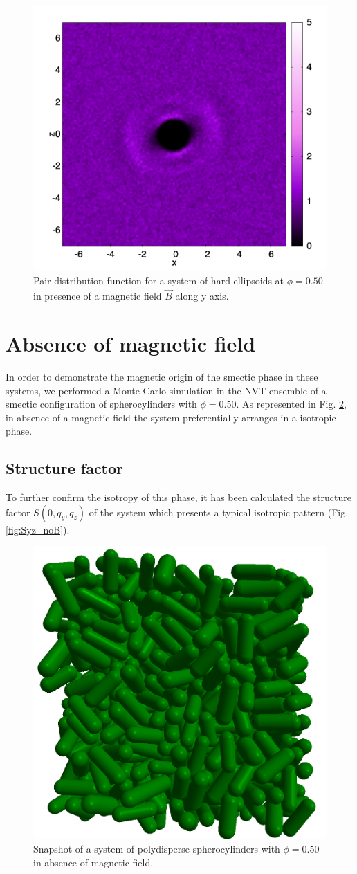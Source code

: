 \documentclass[aip,graphicx]{revtex4-1}
\begin{document}
\begin{figure}
    \centering
    \includegraphics[width=0.7\columnwidth]{gxz_B_HE.png}
    \caption{Pair distribution function for a system of hard ellipsoids at $\phi = 0.50$ in presence of a magnetic field $\vec{B}$ along y axis.}
    \label{fig:gxz_B_HE}
\end{figure}

\section{Absence of magnetic field}

In order to demonstrate the magnetic origin of the smectic phase in these systems, we performed a Monte Carlo simulation in the NVT ensemble of a smectic configuration of spherocylinders with $\phi = 0.50$. As represented in Fig. \ref{fig:noB_snapshot}, in absence of a magnetic field the system preferentially arranges in a isotropic phase.

\subsection{Structure factor}
To further confirm the isotropy of this phase, it has been calculated the structure factor $S(0, q_y, q_z)$ of the system which presents a typical isotropic pattern (Fig. \ref{fig:Syz_noB}).


\begin{figure}
    \centering
    \includegraphics[width=0.5\columnwidth]{Isotropic_phase_snap.png}
    \caption{Snapshot of a system of polydisperse spherocylinders with $\phi = 0.50$ in absence of magnetic field.}
    \label{fig:noB_snapshot}
\end{figure}
\end{document}
